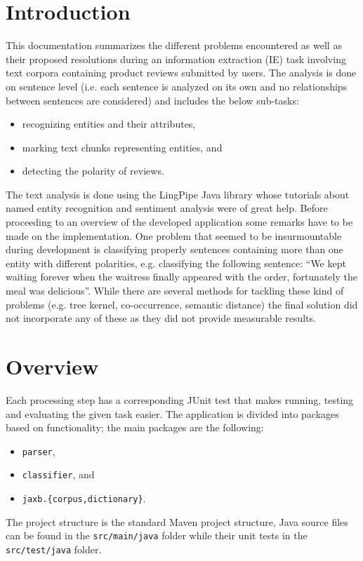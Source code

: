 \section*{Introduction}
This documentation summarizes the different problems encountered as well as
their proposed resolutions during an information extraction (IE) task involving
text corpora containing product reviews submitted by users. The analysis is done
on sentence level (i.e. each sentence is analyzed on its own and no
relationships between sentences are considered) and includes the below
sub-tasks:
\begin{itemize}
  \item recognizing entities and their attributes,
  \item marking text chunks representing entities, and
  \item detecting the polarity of reviews.
\end{itemize}

The text analysis is done using the LingPipe\cite{LingPipe} Java library whose
tutorials about named entity recognition\cite{LingPipeNER} and sentiment
analysis\cite{LingPipeSA} were of great help. Before proceeding to an overview
of the developed application some remarks have to be made on the implementation.
One problem that seemed to be insurmountable during development is classifying
properly sentences containing more than one entity with different polarities,
e.g. classifying the following sentence:
``We kept waiting forever when the waitress finally appeared with the order,
fortunately the meal was delicious''. While there are several methods for
tackling these kind of problems (e.g. tree kernel, co-occurrence, semantic
distance) the final solution did not incorporate any of these as they did not
provide measurable results.

\section*{Overview}
Each processing step has a corresponding JUnit\cite{JUnit} test that makes
running, testing and evaluating the given task easier. The application is
divided into packages based on functionality; the main packages are the
following:
\begin{itemize}
\item \verb|parser|,
\item \verb|classifier|, and
\item \verb|jaxb.{corpus,dictionary}|.
\end{itemize}
The project structure is the standard Maven project structure\cite{Maven}, Java
source files can be found in the \verb|src/main/java| folder while their unit
tests in the \verb|src/test/java| folder.


